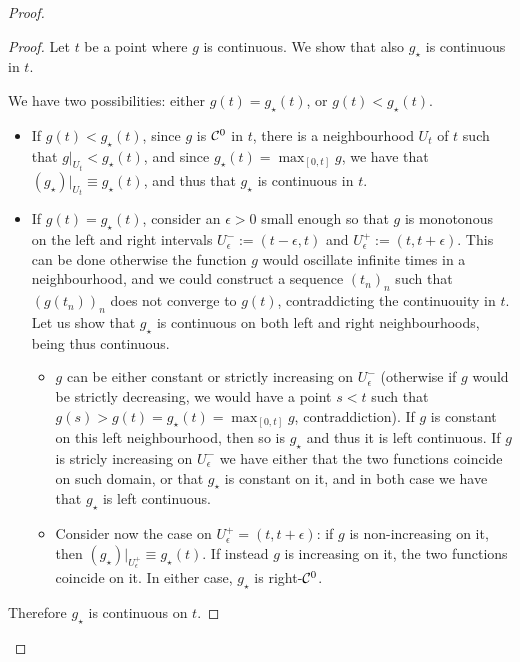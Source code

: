 \begin{proof}
	\begin{proof}
		Let $t$ be a point where $g$ is continuous.
		We show that also $g_\star$ is continuous in $t$.
		
		We have two possibilities: either $g(t) = g_\star(t)$, or $g(t) < g_\star (t)$.
		\begin{itemize}
			\item If $g(t) < g_\star (t)$, since $g$ is $\mathcal{C}^0$ in $t$, there is a neighbourhood $U_t$ of $t$ such that $g|_{U_t} < g_\star(t)$, and since $g_\star(t) = \max_{[0,t]} g$, we have that $(g_\star)|_{U_t} \equiv g_\star(t)$, and thus that $g_\star$ is continuous in $t$.
			\item If $g(t) = g_\star(t)$, consider an $\epsilon>0$ small enough so that $g$ is monotonous on the left and right intervals $U_\epsilon^-:= (t-\epsilon, t)$ and $U_\epsilon^+:=(t,t+\epsilon)$. 
			This can be done otherwise the function $g$ would oscillate infinite times in a neighbourhood, and we could construct a sequence $(t_n)_n$ such that $(g(t_n))_n$ does not converge to $g(t)$, contraddicting the continuouity in $t$.
			Let us show that $g_\star$ is continuous on both left and right neighbourhoods, being thus continuous.
			\begin{itemize}
				\item[$\big( U_\epsilon^- \big)$] $g$ can be either constant or strictly increasing on $U_\epsilon^-$ (otherwise if $g$ would be strictly decreasing, we would have a point $s<t$ such that $g(s) > g(t) = g_\star(t) = \max_{[0,t]} g$, contraddiction).
				If $g$ is constant on this left neighbourhood, then so is $g_\star$ and thus it is left continuous.
				If $g$ is stricly increasing on $U_\epsilon^-$ we have either that the two functions coincide on such domain, or that $g_\star$ is constant on it, and in both case we have that $g_\star$ is left continuous.
				\item[$\big( U_\epsilon^+ \big)$] Consider now the case on $U_\epsilon^+=(t,t+\epsilon)$: if $g$ is non-increasing on it, then $(g_\star)|_{U_\epsilon^+} \equiv g_\star (t)$.
				If instead $g$ is increasing on it, the two functions coincide on it.
				In either case, $g_\star$ is right-$\mathcal{C}^0$.
			\end{itemize}
		\end{itemize}
		
		Therefore $g_\star$ is continuous on $t$.
	\end{proof}
	

\end{proof}
